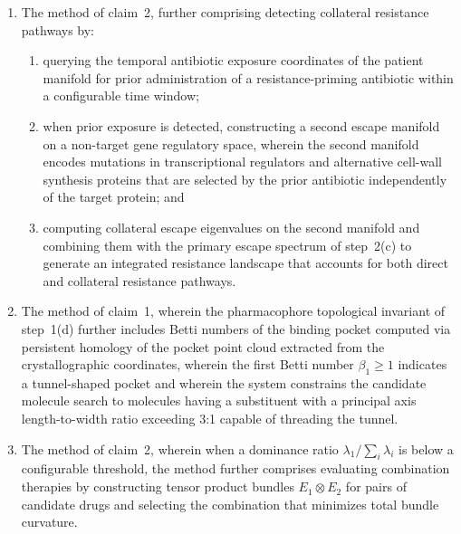 \documentclass[11pt]{article}
\begin{document}
\begin{enumerate}[label=\textbf{\arabic*.}, leftmargin=*, itemsep=1em]
\item The method of claim~2, further comprising detecting collateral resistance pathways by:
\begin{enumerate}[label=(\alph*)]
    \item querying the temporal antibiotic exposure coordinates of the patient manifold for
    prior administration of a resistance-priming antibiotic within a configurable time window;
    \item when prior exposure is detected, constructing a second escape manifold on a non-target
    gene regulatory space, wherein the second manifold encodes mutations in transcriptional
    regulators and alternative cell-wall synthesis proteins that are selected by the prior
    antibiotic independently of the target protein; and
    \item computing collateral escape eigenvalues on the second manifold and combining them
    with the primary escape spectrum of step~2(c) to generate an integrated resistance
    landscape that accounts for both direct and collateral resistance pathways.
\end{enumerate}

\item The method of claim~1, wherein the pharmacophore topological invariant of step~1(d)
further includes Betti numbers of the binding pocket computed via persistent homology of
the pocket point cloud extracted from the crystallographic coordinates, wherein the first
Betti number $\beta_1 \geq 1$ indicates a tunnel-shaped pocket and wherein the system
constrains the candidate molecule search to molecules having a substituent with a principal
axis length-to-width ratio exceeding 3:1 capable of threading the tunnel.

\item The method of claim~2, wherein when a dominance ratio $\lambda_1 / \sum_i \lambda_i$
is below a configurable threshold, the method further comprises evaluating combination
therapies by constructing tensor product bundles $E_1 \otimes E_2$ for pairs of candidate
drugs and selecting the combination that minimizes total bundle curvature.


\end{enumerate}
\end{document}
